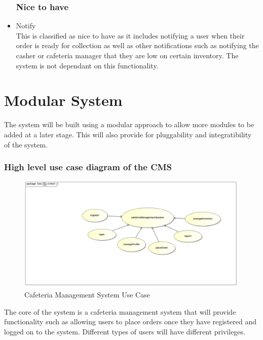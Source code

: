 \documentclass[a4paper,12pt]{article}
\begin{document}
\begin{itemize}
\subsubsection{Nice to have}
\item Notify \\
This is classified as nice to have as it includes notifying a user when their order is ready for collection as well as other notifications such as notifying the casher or cafeteria manager that they are low on certain inventory.  The system is not dependant on this functionality.

\end{itemize}

\section{Modular System}
The system will be built using a modular approach to allow more modules to be added at a later stage. This will also provide for pluggability and integratibility of the system.

\subsubsection{High level use case diagram of the CMS}
\begin{figure}[H]
  \centering
    \includegraphics[width=1.0\textwidth]{images/CMSUseCase.png}
    \caption{Cafeteria Management System Use Case} 
\end{figure}
The core of the system is a cafeteria management system that will provide functionality such as allowing users to place orders once they have registered and logged on to the system. Different types of users will have different privileges. 
\end{document}
